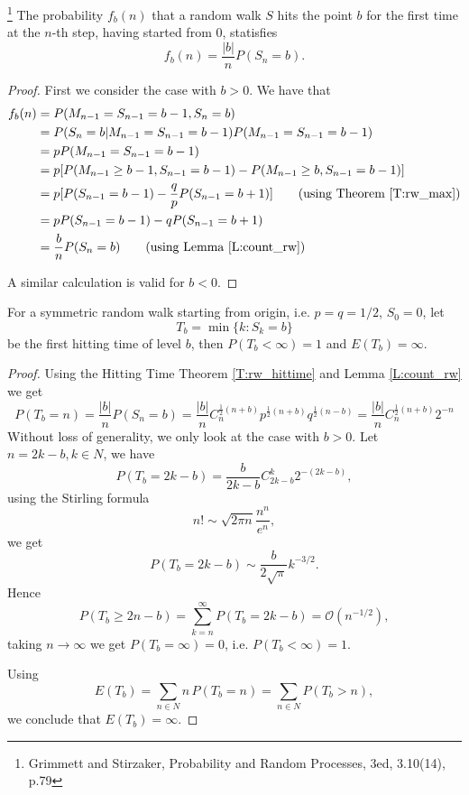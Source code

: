 \begin{theorem}  \label{T:rw_hittime}
\footnote{Grimmett and Stirzaker, Probability and Random Processes, 3ed, 
          3.10(14), p.79}
The probability $f_b(n)$ that a random walk $S$ hits the point $b$ for the 
first time at the $n$-th step, having started from $0$, statisfies
\begin{equation}
  f_b(n) = \frac{|b|}{n} P(S_n=b).
\end{equation}
\end{theorem}
\begin{proof}
First we consider the case with $b>0$. We have that
\begin{align*}
  f_b(n) 
    &= P(M_{n-1}=S_{n-1}=b-1, S_n=b)     \notag \\
    &= P(S_n=b | M_{n-1}=S_{n-1}=b-1) P(M_{n-1}=S_{n-1}=b-1) \notag \\
    &= p P(M_{n-1}=S_{n-1}=b-1) \notag \\
    &= p [ P(M_{n-1}\ge b-1, S_{n-1}=b-1) - P(M_{n-1}\ge b, S_{n-1}=b-1) ]
       \notag \\
    &= p [P(S_{n-1}=b-1) - \frac{q}{p} P(S_{n-1}=b+1)]   
       \qquad \text{(using Theorem \ref{T:rw_max})} \notag \\
    &= p P(S_{n-1}=b-1) - q P(S_{n-1}=b+1)   \notag \\
    &= \frac{b}{n} P(S_n=b)  \qquad \text{(using Lemma \ref{L:count_rw})}
\end{align*}

A similar calculation is valid for $b<0$.
\end{proof}

\begin{corollary} 
For a symmetric random walk starting from origin, i.e. $p=q=1/2$, $S_0=0$, let
\[
  T_b=\min\{k: S_k=b\}
\]
be the first hitting time of level $b$, then 
$P(T_b<\infty )=1$ and $E(T_b)=\infty$.
\end{corollary} 
\begin{proof}
Using the Hitting Time Theorem \ref{T:rw_hittime} and Lemma \ref{L:count_rw} we
get
\[
  P(T_b=n)= \frac{|b|}{n} P(S_n=b)
    = \frac{|b|}{n} C_n^{\frac{1}{2}(n+b)} p^{\frac{1}{2}(n+b)} q^{\frac{1}{2}(n-b)}
    = \frac{|b|}{n} C_n^{\frac{1}{2}(n+b)} 2^{-n}
\]
Without loss of generality, we only look at the case with $b>0$.
Let $n=2k-b, k\in N$, we have
\[
  P(T_b=2k-b)
    = \frac{b}{2k-b} C_{2k-b}^{k} 2^{-(2k-b)},
\]
using the Stirling formula
\[
 n! \sim \sqrt{2\pi n} \frac{n^n}{e^n},
\]
we get 
\[
  P(T_b=2k-b) \sim \frac{b}{2\sqrt{\pi }} k^{-3/2}.
\]
Hence
\[
 P(T_b\ge 2n-b) = \sum_{k=n}^{\infty} P(T_b=2k-b) = \mathcal{O}(n^{-1/2}),
\]
taking $n\to \infty$ we get $P(T_b=\infty)=0$, i.e. $P(T_b<\infty)=1$.

Using
\[
  E(T_b)=\sum_{n\in N} n \, P(T_b=n) = \sum_{n\in N} P(T_b>n),
\]
we conclude that $E(T_b)=\infty$.
\end{proof}






